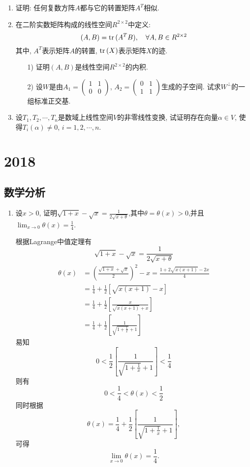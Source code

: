 \documentclass[12pt,a4paper,openany]{book}
\newcommand\tr{\text{tr\,}}
\begin{document}
\begin{enumerate}
\item 证明: 任何复数方阵$A$都与它的转置矩阵$A^T$相似.

\item 在二阶实数矩阵构成的线性空间$R^{2 \times 2}$中定义:
$$
(A, B) = \tr(A^TB), \quad \forall A, B \in R^{2 \times 2}
$$
其中, $A^T$表示矩阵$A$的转置, $\tr(X)$表示矩阵$X$的迹.
\begin{enumerate}
\item[1)] 证明$(A, B)$是线性空间$R^{2 \times 2}$的内积.
\item[2)] 设$W$是由$A_1 = \begin{pmatrix}1 & 1 \\0 & 0\end{pmatrix}$, $A_2 = \begin{pmatrix}0 & 1 \\1 & 1\end{pmatrix}$生成的子空间. 试求$W^{\bot}$的一组标准正交基.
\end{enumerate}

\item 设$T_1, T_2, \cdots, T_n$是数域上线性空间$V$的非零线性变换, 试证明存在向量$\alpha \in V$, 使得$T_i(\alpha) \neq 0$, $i=1,2,\cdots, n$.
\end{enumerate}

\section{2018}
\subsection{数学分析}
\begin{enumerate}
\item 设$x > 0$, 证明$\sqrt{1 + x} - \sqrt{x} = \frac{1}{2\sqrt{x + \theta}}$,其中$\theta=\theta(x) > 0$,并且$\lim_{x \to 0}{\theta(x)} = \frac{1}{4}$.

根据Lagrange中值定理有
\[
\sqrt{1 + x} - \sqrt{x} = \frac{1}{2\sqrt{x + \theta}}
\]
\[
\begin{aligned}
\theta(x) &= (\frac{\sqrt{1+x} + \sqrt{x}}{2})^2 - x = \frac{1 + 2\sqrt{x(x+1)} - 2x}{4} \\
&= \frac{1}{4} + \frac{1}{2}[\sqrt{x(x+1)} - x]\\
&= \frac{1}{4} + \frac{1}{2}[\frac{x}{\sqrt{x(x+1)} + x}] \\
&= \frac{1}{4} + \frac{1}{2}[\frac{1}{\sqrt{1 + \frac{1}{x}} + 1}]
\end{aligned}
\]
易知
\[
0 < \frac{1}{2}[\frac{1}{\sqrt{1 + \frac{1}{x}} + 1}] < \frac{1}{4}
\]
则有
\[
0 < \frac{1}{4} < \theta(x) < \frac{1}{2}
\]
同时根据
\[
\theta(x) = \frac{1}{4} + \frac{1}{2}[\frac{1}{\sqrt{1 + \frac{1}{x}} + 1}],
\]
可得
\[
\lim_{x \to 0}{\theta(x)} = \frac{1}{4}.
\]

\end{enumerate}
\end{document}
